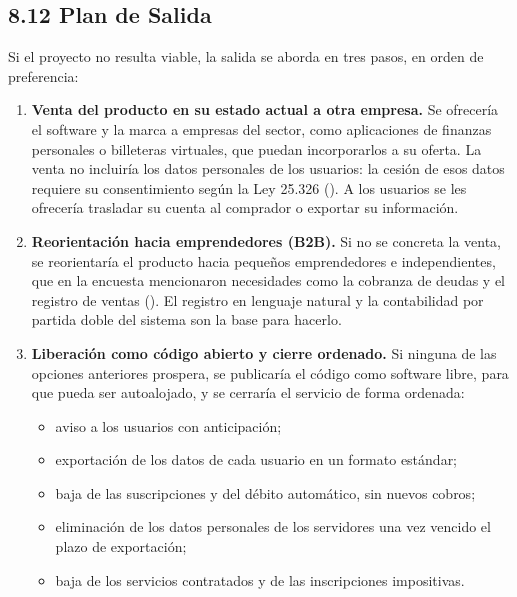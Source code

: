 \subsection*{8.12 Plan de Salida}\label{plan-de-salida}

Si el proyecto no resulta viable, la salida se aborda en tres pasos, en
orden de preferencia:

\begin{enumerate}
\def\labelenumi{\arabic{enumi}.}
\tightlist
\item
  \textbf{Venta del producto en su estado actual a otra empresa.} Se
  ofrecería el software y la marca a empresas del sector, como
  aplicaciones de finanzas personales o billeteras virtuales, que puedan
  incorporarlos a su oferta. La venta no incluiría los datos personales
  de los usuarios: la cesión de esos datos requiere su consentimiento
  según la Ley 25.326 (). A los usuarios se les ofrecería
  trasladar su cuenta al comprador o exportar su información.
\item
  \textbf{Reorientación hacia emprendedores (B2B).} Si no se concreta la
  venta, se reorientaría el producto hacia pequeños emprendedores e
  independientes, que en la encuesta mencionaron necesidades como la
  cobranza de deudas y el registro de ventas
  (). El registro en
  lenguaje natural y la contabilidad por partida doble del sistema son
  la base para hacerlo.
\item
  \textbf{Liberación como código abierto y cierre ordenado.} Si ninguna
  de las opciones anteriores prospera, se publicaría el código como
  software libre, para que pueda ser autoalojado, y se cerraría el
  servicio de forma ordenada:

  \begin{itemize}
  \tightlist
  \item
    aviso a los usuarios con anticipación;
  \item
    exportación de los datos de cada usuario en un formato estándar;
  \item
    baja de las suscripciones y del débito automático, sin nuevos
    cobros;
  \item
    eliminación de los datos personales de los servidores una vez
    vencido el plazo de exportación;
  \item
    baja de los servicios contratados y de las inscripciones
    impositivas.
  \end{itemize}
\end{enumerate}

